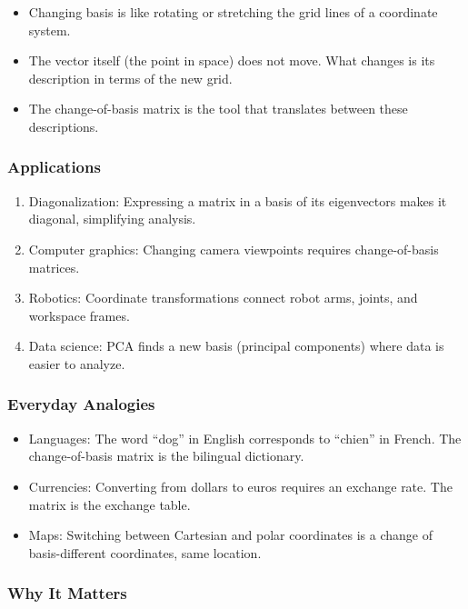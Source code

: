 \documentclass[
  letterpaper,
  DIV=11,
  numbers=noendperiod]{scrreprt}
\providecommand{\tightlist}{%
  \setlength{\itemsep}{0pt}\setlength{\parskip}{0pt}}
\begin{document}
\begin{itemize}
\tightlist
\item
  Changing basis is like rotating or stretching the grid lines of a
  coordinate system.
\item
  The vector itself (the point in space) does not move. What changes is
  its description in terms of the new grid.
\item
  The change-of-basis matrix is the tool that translates between these
  descriptions.
\end{itemize}

\subsubsection{Applications}\label{applications-2}

\begin{enumerate}
\def\labelenumi{\arabic{enumi}.}
\tightlist
\item
  Diagonalization: Expressing a matrix in a basis of its eigenvectors
  makes it diagonal, simplifying analysis.
\item
  Computer graphics: Changing camera viewpoints requires change-of-basis
  matrices.
\item
  Robotics: Coordinate transformations connect robot arms, joints, and
  workspace frames.
\item
  Data science: PCA finds a new basis (principal components) where data
  is easier to analyze.
\end{enumerate}

\subsubsection{Everyday Analogies}\label{everyday-analogies-35}

\begin{itemize}
\tightlist
\item
  Languages: The word ``dog'' in English corresponds to ``chien'' in
  French. The change-of-basis matrix is the bilingual dictionary.
\item
  Currencies: Converting from dollars to euros requires an exchange
  rate. The matrix is the exchange table.
\item
  Maps: Switching between Cartesian and polar coordinates is a change of
  basis-different coordinates, same location.
\end{itemize}

\subsubsection{Why It Matters}\label{why-it-matters-35}
\end{document}
